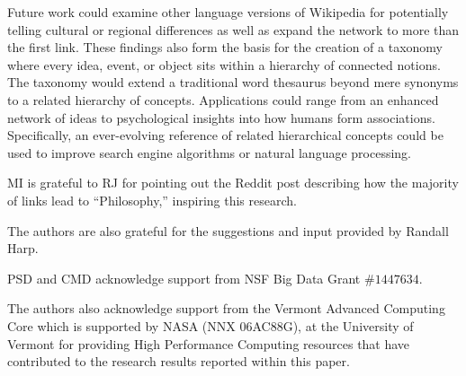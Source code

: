 Future work could examine other language versions of Wikipedia for potentially telling cultural or regional differences as well as expand the network to more than the first link.
These findings also form the basis for the creation of a taxonomy where 
every idea, event, or object sits within a hierarchy of connected notions.
The taxonomy would extend a traditional word thesaurus beyond mere synonyms to a related hierarchy of concepts.
Applications could range from an enhanced network of ideas to psychological insights into how humans form associations.
Specifically, an ever-evolving reference of related hierarchical concepts could be 
used to improve search engine algorithms or natural language processing.


\acknowledgments
MI is grateful to RJ for pointing out the Reddit post 
\cite{reddit}
describing how the majority of links lead to ``Philosophy,'' inspiring this research.

The authors are also grateful for the suggestions and input provided by Randall Harp.

PSD and CMD acknowledge support from NSF Big Data Grant $\#1447634$.

The authors also acknowledge support from the Vermont Advanced Computing Core which is supported by NASA (NNX 06AC88G), at the University of Vermont for providing High Performance Computing resources that have contributed to the research results reported within this paper.


\newpage

